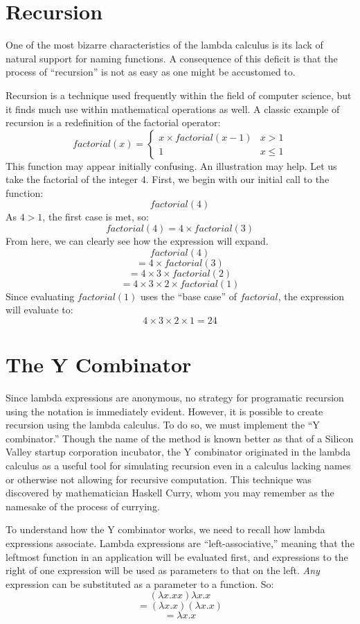 \documentclass[twocolumn,titlepage,12pt]{article}
\begin{document}
\section{Recursion}
One of the most bizarre characteristics of the lambda calculus is its lack of natural support for naming functions. A consequence of this deficit is that the process of ``recursion'' is not as easy as one might be accustomed to.

Recursion is a technique used frequently within the field of computer science, but it finds much use within mathematical operations as well. A classic example of recursion is a redefinition of the factorial operator:
\[
factorial(x)=
\begin{cases}
    x\times factorial(x-1) & x>1 \\
    1 & x\leq 1
\end{cases}
\]
This function may appear initially confusing. An illustration may help. Let us take the factorial of the integer $4$. First, we begin with our initial call to the function:
$$factorial(4)$$
As $4>1$, the first case is met, so:
$$factorial(4)=4\times factorial(3)$$
From here, we can clearly see how the expression will expand.
$$factorial(4)$$
$$=4\times factorial(3)$$
$$=4\times 3\times factorial(2)$$
$$=4\times 3\times 2\times factorial(1)$$
Since evaluating $factorial(1)$ uses the ``base case'' of $factorial$, the expression will evaluate to:
$$4\times 3\times 2\times 1=24$$

\section{The Y Combinator}
Since lambda expressions are anonymous, no strategy for programatic recursion using the notation is immediately evident. However, it is possible to create recursion using the lambda calculus. To do so, we must implement the ``Y combinator.''\cite{ycombmedium} Though the name of the method is known better as that of a Silicon Valley startup corporation incubator, the Y combinator originated in the lambda calculus as a useful tool for simulating recursion even in a calculus lacking names or otherwise not allowing for recursive computation. This technique was discovered by mathematician Haskell Curry, whom you may remember as the namesake of the process of currying.

To understand how the Y combinator works, we need to recall how lambda expressions associate. Lambda expressions are ``left-associative,'' meaning that the leftmost function in an application will be evaluated first, and expressions to the right of one expression will be used as parameters to that on the left. \textit{Any} expression can be substituted as a parameter to a function. So:
$$(\lambda x.xx)\lambda x.x$$
$$=(\lambda x.x)(\lambda x.x)$$
$$=\lambda x.x$$
\end{document}
